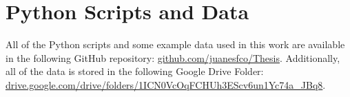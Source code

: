 \chapter{Python Scripts and Data}
\label{ap:pythonScripts}

All of the Python scripts and some example data used in this work are 
available in the following GitHub repository: \url{github.com/juanesfco/Thesis}.
Additionally, all of the data is stored in the following Google Drive Folder: 
\url{drive.google.com/drive/folders/1ICN0VcOqFCHUh3EScv6un1Yc74a_JBq8}.